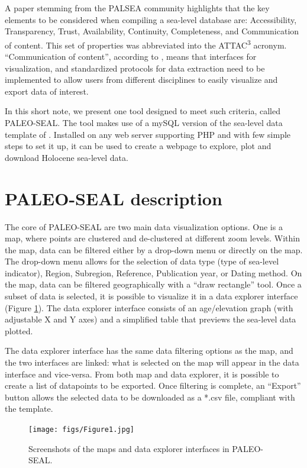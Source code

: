 \documentclass[a4paper,fleqn]{cas-dc}
\begin{document}
A paper stemming from the PALSEA community \citep{dusterhus2016} highlights that the key elements to be considered when compiling a sea-level database are: Accessibility, Transparency, Trust, Availability, Continuity, Completeness, and Communication of content. This set of properties was abbreviated into the ATTAC\textsuperscript{3} acronym. ``Communication of content'',  according to \citet{dusterhus2016}, means that interfaces for visualization, and standardized protocols for data extraction need to be implemented to allow users from different disciplines to easily visualize and export data of interest. 

In this short note, we present one tool designed to meet such criteria, called PALEO-SEAL. The tool makes use of a mySQL version of the sea-level data template of \citet{khan2019}. Installed on any web server supporting PHP and with few simple steps to set it up, it can be used to create a webpage to explore, plot and download Holocene sea-level data. 

\section{PALEO-SEAL description}
The core of PALEO-SEAL are two main data visualization options. One is a map, where points are clustered and de-clustered at different zoom levels. Within the map, data can be filtered either by a drop-down menu or directly on the map. The drop-down menu allows for the selection of data type (type of sea-level indicator), Region, Subregion, Reference, Publication year, or Dating method. On the map, data can be filtered geographically with a ``draw rectangle'' tool. Once a subset of data is selected, it is possible to visualize it in a data explorer interface (Figure \ref{fig:1}). The data explorer interface consists of an age/elevation graph (with adjustable X and Y axes) and a simplified table that previews the sea-level data plotted. 

The data explorer interface has the same data filtering options as the map, and the two interfaces are linked: what is selected on the map will appear in the data interface and vice-versa. From both map and data explorer, it is possible to create a list of datapoints to be exported. Once filtering is complete, an ``Export'' button allows the selected data to be downloaded as a *.csv file, compliant with the \citet{khan2019} template.

\begin{figure}
	\centering
	\texttt{[image: figs/Figure1.jpg]}
	\caption{Screenshots of the maps and data explorer interfaces in PALEO-SEAL.}
	\label{fig:1}
\end{figure}
\end{document}
